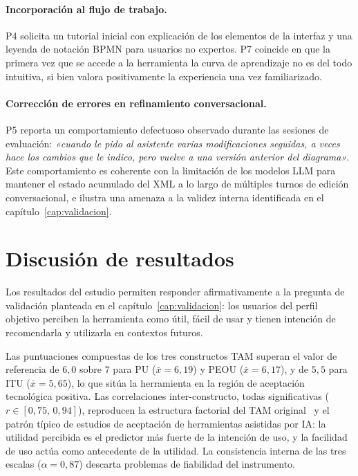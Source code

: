 \paragraph{Incorporación al flujo de trabajo.} P4 solicita un tutorial inicial con explicación de los elementos de la interfaz y una leyenda de notación BPMN para usuarios no expertos. P7 coincide en que la primera vez que se accede a la herramienta la curva de aprendizaje no es del todo intuitiva, si bien valora positivamente la experiencia una vez familiarizado.

\paragraph{Corrección de errores en refinamiento conversacional.} P5 reporta un comportamiento defectuoso observado durante las sesiones de evaluación: \textit{«cuando le pido al asistente varias modificaciones seguidas, a veces hace los cambios que le indico, pero vuelve a una versión anterior del diagrama»}. Este comportamiento es coherente con la limitación de los modelos LLM para mantener el estado acumulado del XML a lo largo de múltiples turnos de edición conversacional, e ilustra una amenaza a la validez interna identificada en el capítulo~\ref{cap:validacion}.

\section{Discusión de resultados}\label{sec:discusion-resultados}

Los resultados del estudio permiten responder afirmativamente a la pregunta de validación planteada en el capítulo~\ref{cap:validacion}: los usuarios del perfil objetivo perciben la herramienta como útil, fácil de usar y tienen intención de recomendarla y utilizarla en contextos futuros.

Las puntuaciones compuestas de los tres constructos TAM superan el valor de referencia de $6{,}0$ sobre $7$ para PU ($\bar{x}=6{,}19$) y PEOU ($\bar{x}=6{,}17$), y de $5{,}5$ para ITU ($\bar{x}=5{,}65$), lo que sitúa la herramienta en la región de aceptación tecnológica positiva. Las correlaciones inter-constructo, todas significativas ($r \in [0{,}75,\, 0{,}94]$), reproducen la estructura factorial del TAM original~\cite{davis1989tam} y el patrón típico de estudios de aceptación de herramientas asistidas por IA: la utilidad percibida es el predictor más fuerte de la intención de uso, y la facilidad de uso actúa como antecedente de la utilidad. La consistencia interna de las tres escalas ($\alpha = 0{,}87$) descarta problemas de fiabilidad del instrumento.

